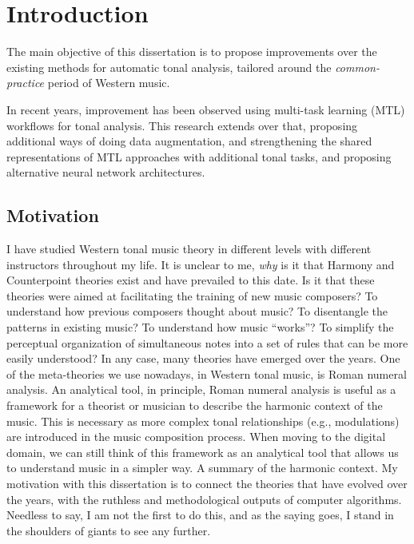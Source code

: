 \chapter{Introduction}
\label{chap:chap1}

    


The main objective of this dissertation is to propose improvements over the existing methods for automatic tonal analysis, tailored around the \emph{common-practice} period of Western music. 

In recent years, improvement has been observed using multi-task learning (MTL) workflows for tonal analysis.
This research extends over that, proposing additional ways of doing data augmentation, and strengthening the shared representations of MTL approaches with additional tonal tasks, and proposing alternative neural network architectures.

\section{Motivation}

I have studied Western tonal music theory in different levels with different instructors throughout my life.
It is unclear to me, \emph{why} is it that Harmony and Counterpoint theories exist and have prevailed to this date.
Is it that these theories were aimed at facilitating the training of new music composers? 
To understand how previous composers thought about music? 
To disentangle the patterns in existing music? 
To understand how music ``works''? 
To simplify the perceptual organization of simultaneous notes into a set of rules that can be more easily understood?
In any case, many theories have emerged over the years.
One of the meta-theories we use nowadays, in Western tonal music, is Roman numeral analysis.
An analytical tool, in principle, Roman numeral analysis is useful as a framework for a theorist or musician to describe the harmonic context of the music.
This is necessary as more complex tonal relationships (e.g., modulations) are introduced in the music composition process.
When moving to the digital domain, we can still think of this framework as an analytical tool that allows us to understand music in a simpler way.
A summary of the harmonic context.
My motivation with this dissertation is to connect the theories that have evolved over the years, with the ruthless and methodological outputs of computer algorithms.
Needless to say, I am not the first to do this, and as the saying goes, I stand in the shoulders of giants to see any further.

